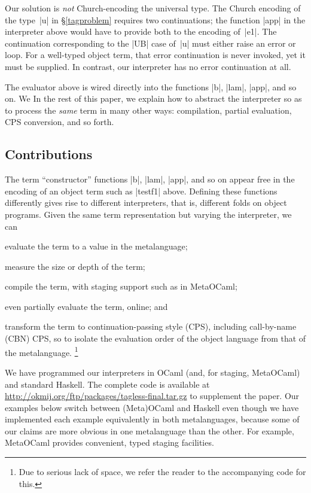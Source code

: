 Our solution is \emph{not} Church-encoding the
universal type. The Church encoding of the type~|u| in \S\ref{tagproblem}
requires two continuations; the function |app| in the interpreter above would
have to provide both to the encoding of~|e1|. The continuation
corresponding to the |UB| case of~|u| must either raise an error or
loop. For a well-typed object term, that error continuation is never
invoked, yet it must be supplied. In contrast, our interpreter has no error
continuation at all.

The evaluator above is wired directly into the
functions |b|, |lam|, |app|, and so on.  \ifshort We \else In the rest of this paper, we \fi
explain how to abstract the interpreter so as
to process the \emph{same} term in many other
ways: compilation, partial evaluation, CPS
conversion, and so forth.

\subsection{Contributions}\label{contributions}

The term ``constructor'' functions |b|, |lam|, |app|, and so on appear
free in the encoding of an object term such as |testf1| above.  Defining
these functions differently gives rise to different interpreters, that
is, different folds on object programs.  Given the same term
representation but varying the interpreter, we can
\begin{itemize*}
    \item evaluate the term to a value in the metalanguage;
    \item measure the size or depth of the term;
    \item compile the term, with staging support such as in MetaOCaml;
    \item even partially evaluate the term, online; and
    \item transform the term to continuation\hyp passing style (CPS),
        including call-by-name (CBN) CPS, so to isolate the evaluation
        order of the object language from that of the metalanguage.\ifshort
\footnote{Due to serious lack of space, 
we refer the reader to the accompanying code for this.}\fi
\end{itemize*}
We have programmed our interpreters in OCaml (and, for staging,
MetaOCaml) and standard Haskell. The complete code is available at
\url{http://okmij.org/ftp/packages/tagless-final.tar.gz}
to supplement the paper. Our examples below switch between (Meta)OCaml
and Haskell even though we have implemented each example equivalently in
both metalanguages, because some of our claims are more obvious in one
metalanguage than the other.  For example, MetaOCaml provides
convenient, typed staging facilities.

